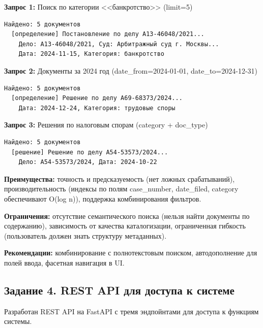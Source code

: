 \documentclass[a4paper,12pt]{article}
\begin{document}
\begin{infobox}
\textbf{Запрос 1:} Поиск по категории <<банкротство>> (limit=5)

\begin{verbatim}
Найдено: 5 документов
  [определение] Постановление по делу A13-46048/2021...
    Дело: A13-46048/2021, Суд: Арбитражный суд г. Москвы...
    Дата: 2024-11-15, Категория: банкротство
\end{verbatim}

\textbf{Запрос 2:} Документы за 2024 год (date\_from=2024-01-01, date\_to=2024-12-31)

\begin{verbatim}
Найдено: 5 документов
  [определение] Решение по делу A69-68373/2024...
    Дата: 2024-12-24, Категория: трудовые споры
\end{verbatim}

\textbf{Запрос 3:} Решения по налоговым спорам (category + doc\_type)

\begin{verbatim}
Найдено: 5 документов
  [решение] Решение по делу A54-53573/2024...
    Дело: A54-53573/2024, Дата: 2024-10-22
\end{verbatim}
\end{infobox}

\begin{infobox}
\textbf{Преимущества:} точность и предсказуемость (нет ложных срабатываний), производительность (индексы по полям case\_number, date\_filed, category обеспечивают O(log n)), поддержка комбинирования фильтров.

\textbf{Ограничения:} отсутствие семантического поиска (нельзя найти документы по содержанию), зависимость от качества каталогизации, ограниченная гибкость (пользователь должен знать структуру метаданных).

\textbf{Рекомендации:} комбинирование с полнотекстовым поиском, автодополнение для полей ввода, фасетная навигация в UI.
\end{infobox}

\subsection{Задание 4. REST API для доступа к системе}

Разработан REST API на FastAPI с тремя эндпойнтами для доступа к функциям системы.
\end{document}

